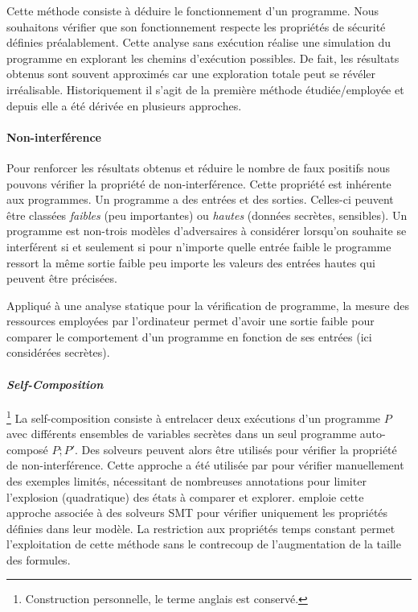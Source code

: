 Cette méthode consiste à déduire le fonctionnement d'un programme. Nous souhaitons vérifier que son fonctionnement respecte les propriétés de sécurité définies préalablement. Cette analyse sans exécution réalise une simulation du programme en explorant les chemins d'exécution possibles. De fait, les résultats obtenus sont souvent approximés car une exploration totale peut se révéler irréalisable. Historiquement il s'agit de la première méthode étudiée/employée et depuis elle a été dérivée en plusieurs approches.\medbreak

\paragraph{Non-interférence} Pour renforcer les résultats obtenus et réduire le nombre de faux positifs nous pouvons vérifier la propriété de non-interférence. Cette propriété est inhérente aux programmes. Un programme a des entrées et des sorties. Celles-ci peuvent être classées \textit{faibles} (peu importantes) ou \textit{hautes} (données secrètes, sensibles). Un programme est non-trois modèles d'adversaires à considérer lorsqu'on souhaite se interférent si et seulement si pour n'importe quelle entrée faible le programme ressort la même sortie faible peu importe les valeurs des entrées hautes qui peuvent être précisées.

Appliqué à une analyse statique pour la vérification de programme, la mesure des ressources employées par l'ordinateur permet d'avoir une sortie faible pour comparer le comportement d'un programme en fonction de ses entrées (ici considérées secrètes).

\paragraph{\textit{Self-Composition}}\footnote{Construction personnelle, le terme anglais est conservé.} La self-composition consiste à entrelacer deux exécutions d'un programme $P$ avec différents ensembles de variables secrètes dans un seul programme auto-composé $P;P'$. Des solveurs peuvent alors être utilisés pour vérifier la propriété de non-interférence. Cette approche a été utilisée par \citeauthor{ABPV13} \cite{ABPV13} pour vérifier manuellement des exemples limités, nécessitant de nombreuses annotations pour limiter l'explosion (quadratique) des états à comparer et explorer. \cite{binsecRel2019} emploie cette approche associée à des solveurs SMT pour vérifier uniquement les propriétés définies dans leur modèle. La restriction aux propriétés temps constant permet l'exploitation de cette méthode sans le contrecoup de l'augmentation de la taille des formules.

